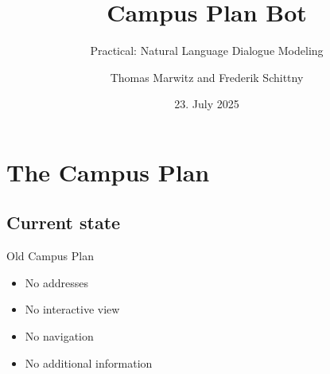 \documentclass{sdqbeamer}[smallfoot]
\title[Campus Plan Bot]{Campus Plan Bot}
\subtitle{Practical: Natural Language Dialogue Modeling}
\author[Marwitz, Schittny]{Thomas Marwitz and Frederik Schittny}
\date[23.\,7.\,2025]{23. July 2025}
\begin{document}
\begin{frame}[title white horizontal, picture=images/campusplan_cover, kitlogo=black]
\titlepage
\end{frame}



\section{The Campus Plan}
\subsection{Current state}
\begin{frame}[picture 66 vertical,picture=images/old_campusplan,kitlogo=black]{Old Campus Plan}
    \begin{itemize}
        \item No addresses
        \item No interactive view
        \item No navigation
        \item No additional information
    \end{itemize}
\end{frame}
\end{document}
